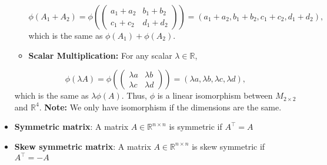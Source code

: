 \documentclass{report}
\begin{document}
\begin{itemize}
\begin{itemize}
                    \[
                        \phi(A_1 + A_2) = \phi\left(\begin{pmatrix} a_1 + a_2 & b_1 + b_2 \\ c_1 + c_2 & d_1 + d_2 \end{pmatrix}\right) = (a_1 + a_2, b_1 + b_2, c_1 + c_2, d_1 + d_2),
                    \]
                    which is the same as $\phi(A_1) + \phi(A_2)$.
                \item  \textbf{Scalar Multiplication:} For any scalar $\lambda \in \mathbb{R}$,
            \end{itemize}
            \[
                \phi(\lambda A) = \phi\left(\begin{pmatrix} \lambda a & \lambda b \\ \lambda c & \lambda d \end{pmatrix}\right) = (\lambda a, \lambda b, \lambda c, \lambda d),
            \]
            \bigbreak \noindent 
            which is the same as $\lambda \phi(A)$.
            \bigbreak \noindent 
            Thus, $\phi$ is a linear isomorphism between $M_{2 \times 2}$ and $\mathbb{R}^4$.
            \bigbreak \noindent 
            \textbf{Note:} We only have isomorphism if the dimensions are the same.


    \end{itemize}


    
    \pagebreak 
    \begin{itemize}
        \item \textbf{Symmetric matrix}: A matrix $A \in \mathbb{R}^{n\times n}$ is symmetric if $A^{\top} = A$
        \item \textbf{Skew symmetric matrix}: A matrix $A \in \mathbb{R}^{n\times n}$ is skew symmetric if $A^{\top} = -A$
    \end{itemize}







    
\end{document}
